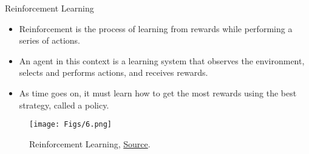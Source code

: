\documentclass[compress,oilve]{beamer}
\begin{document}
\begin{frame}{Reinforcement Learning}
\begin{itemize}
	\item Reinforcement is the process of learning from rewards while performing a series of actions.
	
	\item An agent in this context is a learning system that observes the environment, selects and performs actions, and receives rewards. 
	
	\item As time goes on, it must learn how to get the most rewards using the best strategy, called a policy.
	
\end{itemize}

	\begin{figure}
		 \centering
		 \texttt{[image: Figs/6.png]}  
		 \caption{Reinforcement Learning, \href{https://tinyurl.com/2f6plway}{Source}.}
	\end{figure}

\end{frame}
\end{document}
